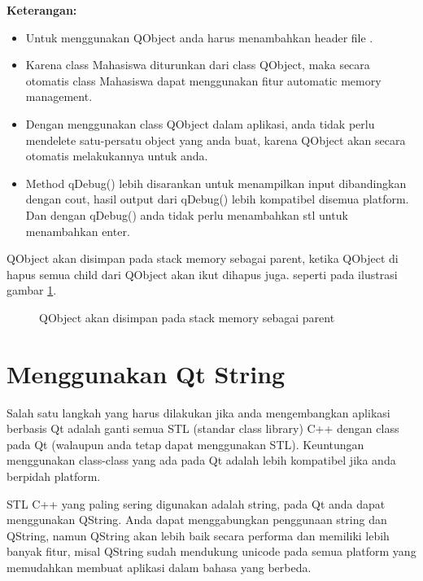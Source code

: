 \textbf{Keterangan:}

\begin{itemize}

\item
  Untuk menggunakan QObject anda harus menambahkan header file .
\item
  Karena class Mahasiswa diturunkan dari class QObject, maka secara
  otomatis class Mahasiswa dapat menggunakan fitur automatic memory
  management.
\item
  Dengan menggunakan class QObject dalam aplikasi, anda tidak perlu
  mendelete satu-persatu object yang anda buat, karena QObject akan
  secara otomatis melakukannya untuk anda.
\item
  Method qDebug() lebih disarankan untuk menampilkan input dibandingkan
  dengan cout, hasil output dari qDebug() lebih kompatibel disemua
  platform. Dan dengan qDebug() anda tidak perlu menambahkan stl untuk
  menambahkan enter.
\end{itemize}

QObject akan disimpan pada stack memory sebagai parent, ketika QObject
di hapus semua child dari QObject akan ikut dihapus juga. seperti pada ilustrasi
gambar \ref{fig:capture11-1}.

\begin{figure}
\centering
{}
\caption{QObject akan disimpan pada stack memory sebagai parent}
\label{fig:capture11-1}
\end{figure}




\section{Menggunakan Qt String}\label{menggunakan-qt-string}

Salah satu langkah yang harus dilakukan jika anda mengembangkan aplikasi
berbasis Qt adalah ganti semua STL (standar class library) C++ dengan
class pada Qt (walaupun anda tetap dapat menggunakan STL). Keuntungan
menggunakan class-class yang ada pada Qt adalah lebih kompatibel jika
anda berpidah platform.

STL C++ yang paling sering digunakan adalah string, pada Qt anda dapat
menggunakan QString. Anda dapat menggabungkan penggunaan string dan
QString, namun QString akan lebih baik secara performa dan memiliki
lebih banyak fitur, misal QString sudah mendukung unicode pada semua
platform yang memudahkan membuat aplikasi dalam bahasa yang berbeda.

